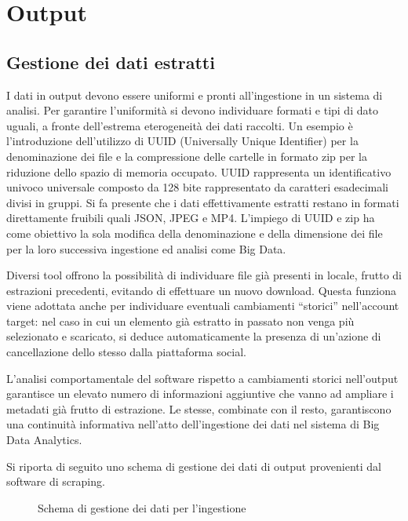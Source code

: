 \section{Output}
\subsection{Gestione dei dati estratti}
I dati in output devono essere uniformi e pronti all'ingestione in un sistema di analisi. Per garantire l'uniformit\`a si devono individuare formati e tipi di dato uguali, a fronte dell'estrema eterogeneit\`a dei dati raccolti. 
Un esempio \`e l'introduzione dell'utilizzo di UUID (Universally Unique Identifier) per la denominazione dei file e la compressione delle cartelle in formato zip per la riduzione dello spazio di memoria occupato. UUID rappresenta un identificativo univoco universale composto da 128 bite rappresentato da caratteri esadecimali divisi in gruppi.
Si fa presente che i dati effettivamente estratti restano in formati direttamente fruibili quali JSON, JPEG e MP4. L'impiego di UUID e zip ha come obiettivo la sola modifica della denominazione e della dimensione dei file per la loro successiva ingestione ed analisi come Big Data.

Diversi tool offrono la possibilit\`a di individuare file gi\`a presenti in locale, frutto di estrazioni precedenti, evitando di effettuare un nuovo download. Questa funziona viene adottata anche per individuare eventuali cambiamenti ``storici'' nell'account target: nel caso in cui un elemento gi\`a estratto in passato non venga pi\`u selezionato e scaricato, si deduce automaticamente la presenza di un'azione di cancellazione dello stesso dalla piattaforma social.

L'analisi comportamentale del software rispetto a cambiamenti storici nell'output garantisce un elevato numero di informazioni aggiuntive che vanno ad ampliare i metadati gi\`a frutto di estrazione. Le stesse, combinate con il resto, garantiscono una continuit\`a informativa nell'atto dell'ingestione dei dati nel sistema di Big Data Analytics.

Si riporta di seguito uno schema di gestione dei dati di output provenienti dal software di scraping.

\begin{figure}[!htb]
  \begin{center}
  
  \caption{Schema di gestione dei dati per l'ingestione}
\end{center}
\end{figure}
\newpage
